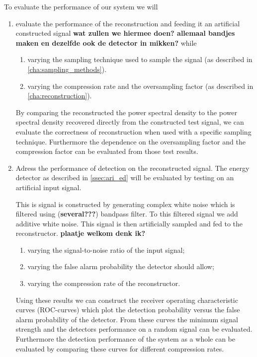 \documentclass[a4paper, openany, oneside]{memoir}
\begin{document}
To evaluate the performance of our system we will 
\begin{enumerate}
	\item evaluate the performance of the reconstruction and feeding it an artificial constructed signal \textbf{wat zullen we hiermee doen? allemaal bandjes maken en dezelfde ook de detector in mikken?} while

	\begin{enumerate}
		\item varying the sampling technique used to sample the signal (as described in \cref{cha:sampling_methods}).
		\item varying the compression rate and the oversampling factor (as described in \cref{cha:reconstruction}).
	\end{enumerate}

	By comparing the reconstructed the power spectral density to the power spectral density recovered directly from the constructed test signal, we can evaluate the correctness of reconstruction when used with a specific sampling technique.
	Furthermore the dependence on the oversampling factor and
	the compression factor can be evaluated from those test results. 
	
	\item Adress the performance of detection on the reconstructed signal. The energy detector as described in \cref{ssec:ari_ed} will be evaluated by testing on an artificial input signal. 

	This is signal is constructed by generating complex white noise which is filtered using (\textbf{several???}) bandpass filter. To this filtered signal we add additive white noise. This signal is then artificially sampled and fed to the reconstructor. 
	\textbf{plaatje welkom denk ik?}
	
	\begin{enumerate}
		\item varying the signal-to-noise ratio of the input signal; 
		\item varying the false alarm probability the detector 
		should allow;
		\item varying the compression rate of the reconstructor.
	\end{enumerate}
	Using these results we can construct the receiver operating characteristic curves (ROC-curves) which plot the detection probability versus the false alarm probability of the detector. 
	From these curves the minimum signal strength and the detectors performance on a random signal can be evaluated. Furthermore the detection performance of the system as a whole can be evaluated by comparing these curves for different compression rates.
	\end{enumerate}
\end{document}
